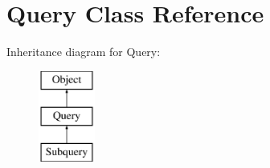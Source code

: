 \hypertarget{classQuery}{}\section{Query Class Reference}
\label{classQuery}
Inheritance diagram for Query\+:\begin{figure}[H]
\begin{center}
\leavevmode
\includegraphics[height=3.000000cm]{classQuery}
\end{center}
\end{figure}
